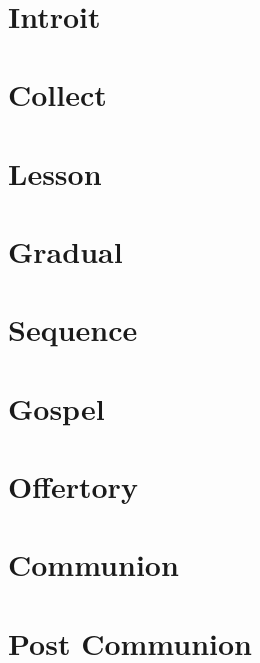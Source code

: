 \documentclass[a5paper,10pt]{memoir}
\begin{document}


\begin{center}
  {\LARGE \masstype}

  ~

  {\Large\scshape \feast}

\end{center}

% 
\section{Introit}
\black{
  \l{\introit}
  \e{\introitTranslation}
}
% 

\section{Collect}
\black{\collect}

\section{Lesson}
\black{\lesson}

% 
\section{Gradual}
\black{
  \l{\gradual}
  \e{\gradualTranslation}
}
% 
% 
\section{Sequence}
\black{
  \l{\sequentia}
  \e{\sequentiaTranslation}
}
% 

\section{Gospel}
\black{\gospel}

\section{Offertory}
\black{
  \l{\offertory}
  \e{\offertoryTranslation}
}

\section{Communion}
\black{
  \l{\communion}
  \e{\communionTranslation}
}

\section{Post Communion}
\black{\postcommunion}

% 

\vfill
{}
\begin{center}
  \+
\end{center}


\printFoot
\end{document}
